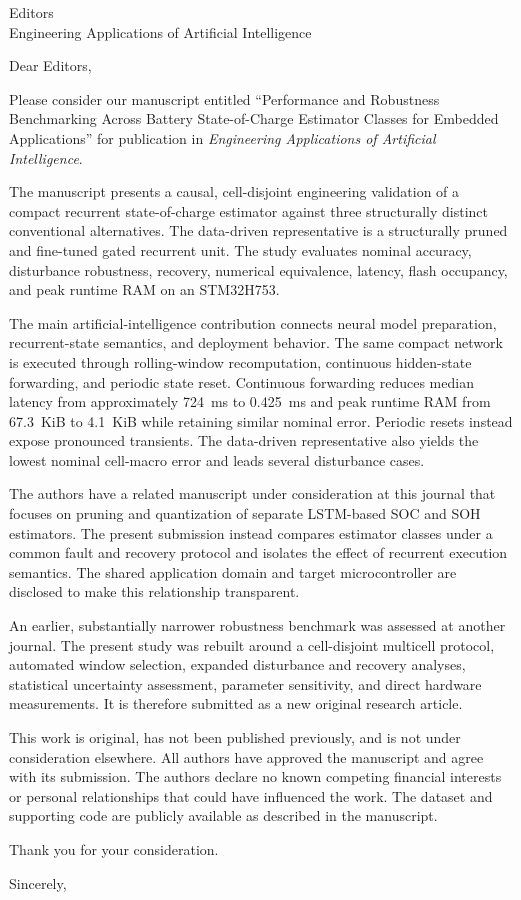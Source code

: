 \documentclass[10pt,a4paper]{letter}
\date{3 September 2026}
\begin{document}
\begin{letter}{Editors\\Engineering Applications of Artificial Intelligence}
\opening{Dear Editors,}

Please consider our manuscript entitled ``Performance and Robustness Benchmarking Across Battery State-of-Charge Estimator Classes for Embedded Applications'' for publication in \emph{Engineering Applications of Artificial Intelligence}.

The manuscript presents a causal, cell-disjoint engineering validation of a compact recurrent state-of-charge estimator against three structurally distinct conventional alternatives. The data-driven representative is a structurally pruned and fine-tuned gated recurrent unit. The study evaluates nominal accuracy, disturbance robustness, recovery, numerical equivalence, latency, flash occupancy, and peak runtime RAM on an STM32H753.

The main artificial-intelligence contribution connects neural model preparation, recurrent-state semantics, and deployment behavior. The same compact network is executed through rolling-window recomputation, continuous hidden-state forwarding, and periodic state reset. Continuous forwarding reduces median latency from approximately 724~ms to 0.425~ms and peak runtime RAM from 67.3~KiB to 4.1~KiB while retaining similar nominal error. Periodic resets instead expose pronounced transients. The data-driven representative also yields the lowest nominal cell-macro error and leads several disturbance cases.

The authors have a related manuscript under consideration at this journal that focuses on pruning and quantization of separate LSTM-based SOC and SOH estimators. The present submission instead compares estimator classes under a common fault and recovery protocol and isolates the effect of recurrent execution semantics. The shared application domain and target microcontroller are disclosed to make this relationship transparent.

An earlier, substantially narrower robustness benchmark was assessed at another journal. The present study was rebuilt around a cell-disjoint multicell protocol, automated window selection, expanded disturbance and recovery analyses, statistical uncertainty assessment, parameter sensitivity, and direct hardware measurements. It is therefore submitted as a new original research article.

This work is original, has not been published previously, and is not under consideration elsewhere. All authors have approved the manuscript and agree with its submission. The authors declare no known competing financial interests or personal relationships that could have influenced the work. The dataset and supporting code are publicly available as described in the manuscript.

Thank you for your consideration.

\closing{Sincerely,}
\end{letter}
\end{document}
